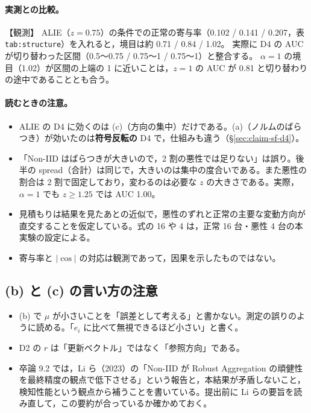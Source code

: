 \documentclass[a4j, dvipdfmx]{jsarticle}  %
\begin{document}
\paragraph{実測との比較。}【観測】
ALIE（$z = 0.75$）の条件での正常の寄与率（0.102 / 0.141 / 0.207，表 \texttt{tab:structure}）を入れると，境目は約 0.71 / 0.84 / 1.02。
実際に D4 の AUC が切り替わった区間（0.5〜0.75 / 0.75〜1 / 0.75〜1）と整合する。
$\alpha = 1$ の境目（1.02）が区間の上端の 1 に近いことは，$z = 1$ の AUC が 0.81 と切り替わりの途中であることとも合う。

\paragraph{読むときの注意。}
\begin{itemize}
  \item ALIE の D4 に効くのは (c)（方向の集中）だけである。(a)（ノルムのばらつき）が効いたのは\textbf{符号反転の} D4 で，仕組みも違う（\S\ref{sec:claim-sf-d4}）。
  \item 「Non-IID はばらつきが大きいので，2 割の悪性では足りない」は誤り。後半の spread（合計）は同じで，大きいのは集中の度合いである。また悪性の割合は 2 割で固定しており，変わるのは必要な $z$ の大きさである。実際，$\alpha = 1$ でも $z \ge 1.25$ では AUC 1.00。
  \item 見積もりは結果を見たあとの近似で，悪性のずれと正常の主要な変動方向が直交することを仮定している。式の 16 や 4 は，正常 16 台・悪性 4 台の本実験の設定による。
  \item 寄与率と $|\cos|$ の対応は観測であって，因果を示したものではない。
\end{itemize}

\subsection{(b) と (c) の言い方の注意}
\label{sec:claim-noniid-notes}

\begin{itemize}
  \item (b) で $\mu$ が小さいことを「誤差として考える」と書かない。測定の誤りのように読める。「$e_i$ に比べて無視できるほど小さい」と書く。
  \item D2 の $r$ は「更新ベクトル」ではなく「参照方向」である。
  \item 卒論 9.2 では，Li ら（2023）の「Non-IID が Robust Aggregation の頑健性を最終精度の観点で低下させる」という報告と，本結果が矛盾しないこと，検知性能という観点から補うことを書いている。提出前に Li らの要旨を読み直して，この要約が合っているか確かめておく。
\end{itemize}
\end{document}
